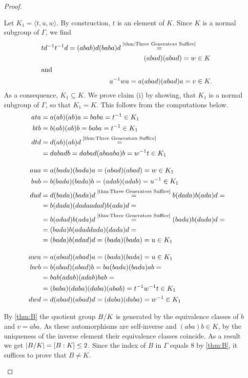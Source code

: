 \begin{proof}
\begin{plist}
\item Let $K_1=\langle t,u,w\rangle$. By construction, $t$ is an element of $K$. Since $K$ is a normal subgroup of $\Gamma$, we find
\begin{align*}
td^{-1}t^{-1}d=(abab)d(baba)d\overset{\text{\cref{thm:Three Generators Suffice}}}{=}&\\
(abad)(abad)=w&\in K\\
\intertext{and}
a^{-1}wa=a(abad)(abad)a=v&\in K.
\end{align*}
As a consequence, $K_1\subseteq K$. We prove claim (i) by showing, that $K_1$ is a normal subgroup of $\Gamma$, so that $K_1=K$. This follows from the computations below.
\begin{align*}
ata	&=a(ab)(ab)a=baba=t^{-1}\in K_1\\
btb	&=b(ab)(ab)b=baba=t^{-1}\in K_1\\
dtd	&=d(ab)(ab)d\overset{\text{\cref{thm:Three Generators Suffice}}}{=}\\
		&=dabadb=dabad(abaaba)b=w^{-1}t\in K_1\\[1em]
aua	&=a(bada)(bada)a=(abad)(abad)=w\in K_1\\
bub	&=b(bada)(bada)b=(adab)(adab)=u^{-1}\in K_1\\
dud	&=d(bada)(bada)d\overset{\text{\cref{thm:Three Generators Suffice}}}{=}b(dada)b(ada)d=\\
	&=b(dada)(dadaadad)b(ada)d=\\
	&=b(adad)b(ada)d\overset{\text{\cref{thm:Three Generators Suffice}}}{=}(bada)b(dada)d=\\
	&=(bada)b(adaddada)(dada)d=\\
	&=(bada)b(adad)d=(bada)(bada)=u\in K_1\\[1em]
awa	&=a(abad)(abad)a=(bada)(bada)=u\in K_1\\
bwb	&=b(abad)(abad)b=ba(bada)(bada)ab=\\
		&=bab(adab)(adab)bab=\\
		&=(baba)(daba)(daba)(abab)=t^{-1}w^{-1}t\in K_1\\
dwd	&=d(abad)(abad)d=(daba)(daba)=w^{-1}\in K_1
\end{align*}
\item\label{p:Index of K in Gamma} By \cref{thm:B} the quotient group $\nicefrac{B}{K}$ is generated by the equivalence classes of $b$ and $v=aba$. As these automorphisms are self-inverse and $(aba)b\in K$, by the uniqueness of the inverse element their equivalence classes  coincide. As a result we get $\lvert\nicefrac{B}{K}\rvert=[B:K]\leq 2$. Since the index of $B$ in $\Gamma$ equals 8 by \cref{thm:B}, it suffices to prove that $B\neq K$.\\

\end{plist}
\end{proof}
